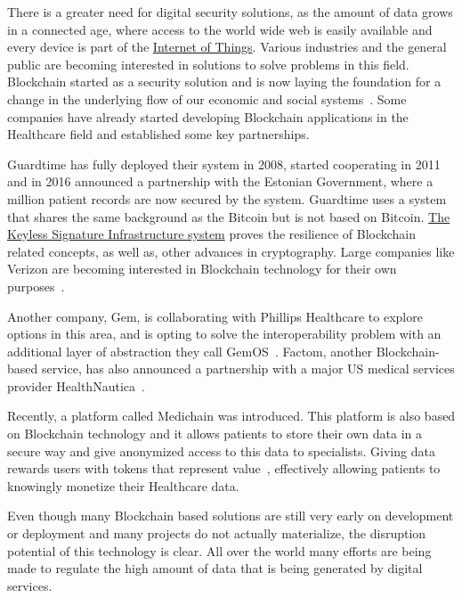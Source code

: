 There is a greater need for digital security solutions, as the amount of data
grows in a connected age, where access to the world wide web is easily
available and every device is part of the
\href{https://en.wikipedia.org/wiki/Internet_of_things}{Internet of Things}.
Various industries and the general public are becoming interested in solutions
to solve problems in this field. Blockchain started as a security solution and
is now laying the foundation for a change in the underlying flow of our
economic and social systems~\cite{Zago2018,Marr2018,Long2018}. Some companies
have already started developing Blockchain applications in the Healthcare field
and established some key partnerships.

Guardtime has fully deployed their system in 2008, started cooperating in 2011
and in 2016 announced a partnership with the Estonian Government, where a
million patient records are now secured by the system. Guardtime uses a system
that shares the same background as the Bitcoin but is not based on Bitcoin.
\href{https://guardtime.com/technology}{The Keyless Signature Infrastructure
system} proves the resilience of Blockchain related concepts, as well as, other
advances in cryptography. Large companies like Verizon are becoming interested
in Blockchain technology for their own
purposes~\cite{GuardTime2018,EstonianGovernmentGuardTime2016}.

Another company, Gem, is collaborating with Phillips Healthcare to explore
options in this area\cite{philips2016}, and is opting to solve the
interoperability problem with an additional layer of abstraction they call
GemOS~\cite{gemOS2018}. Factom, another Blockchain-based service, has also
announced a partnership with a major US medical services provider
HealthNautica~\cite{BlockchainCompHealth2017,FactomPartnership2017}.

Recently, a platform called Medichain was introduced. This platform is also
based on Blockchain technology and it allows patients to store their own data
in a secure way and give anonymized access to this data to specialists. Giving
data rewards users with tokens that represent value~\cite{MediChain2018},
effectively allowing patients to knowingly monetize their Healthcare data.

Even though many Blockchain based solutions are still very early on development
or deployment and many projects do not actually materialize, the disruption
potential of this technology is clear. All over the world many efforts are
being made to regulate the high amount of data that is being generated by
digital services.


